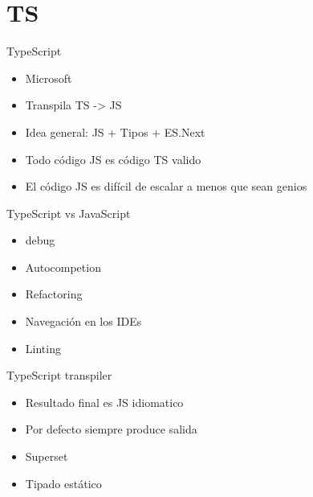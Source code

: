 \documentclass[aspectratio=169]{beamer}
\begin{document}
{
    \section{TS}
}


\begin{frame}{TypeScript}
\begin{itemize}
	\item Microsoft
	\item Transpila TS -> JS
	\item Idea general: JS + Tipos + ES.Next
	\item Todo código JS es código TS valido
	\item El código JS es difícil de escalar a menos que sean genios
\end{itemize}
\end{frame}

\begin{frame}{TypeScript vs JavaScript}
\begin{itemize}
	\item debug
	\item Autocompetion
	\item Refactoring
	\item Navegación en los IDEs
	\item Linting
\end{itemize}
\end{frame}

\begin{frame}{TypeScript transpiler}
\begin{itemize}
	\item Resultado final es JS idiomatico
	\item Por defecto siempre produce salida
	\item Superset
	\item Tipado estático
\end{itemize}
\end{frame}
\end{document}
